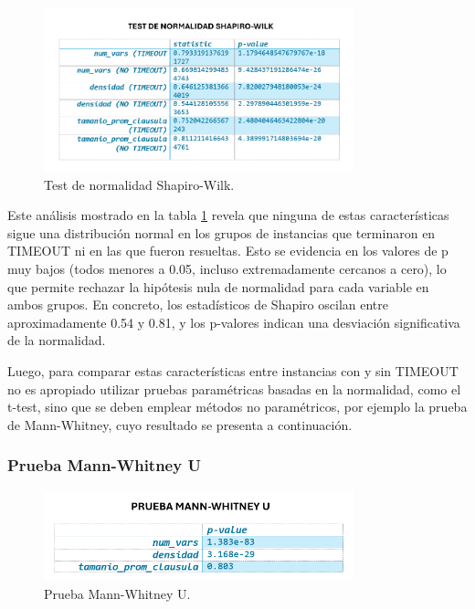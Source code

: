 \begin{figure}[ht]
    \centering
    \includegraphics[width=0.8\textwidth]{Graphics/test_shapiro_wilk.png}
    \caption{Test de normalidad Shapiro-Wilk.}
    \label{fig:test-shapiro-wilk}
\end{figure}

Este an\'alisis mostrado en la tabla \ref{fig:test-shapiro-wilk} revela que ninguna de estas características sigue una distribución normal en los grupos de instancias que terminaron en TIMEOUT ni en las que fueron resueltas. Esto se evidencia en los valores de p muy bajos (todos menores a 0.05, incluso extremadamente cercanos a cero), lo que permite rechazar la hipótesis nula de normalidad para cada variable en ambos grupos. En concreto, los estadísticos de Shapiro oscilan entre aproximadamente 0.54 y 0.81, y los p-valores indican una desviación significativa de la normalidad.

Luego, para comparar estas características entre instancias con y sin TIMEOUT no es apropiado utilizar pruebas paramétricas basadas en la normalidad, como el t-test, sino que se deben emplear métodos no paramétricos, por ejemplo la prueba de Mann-Whitney, cuyo resultado se presenta a continuaci\'on. 

\subsubsection{Prueba Mann-Whitney U}

\begin{figure}[ht]
    \centering
    \includegraphics[width=0.8\textwidth]{Graphics/prueba_mann_whitney_u.png}
    \caption{Prueba Mann-Whitney U.}
    \label{fig:prueba-mann-whitney-u}
\end{figure}

